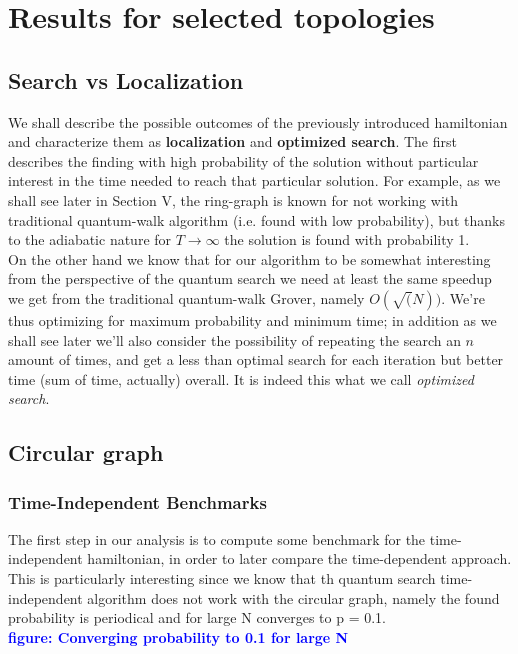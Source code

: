 \documentclass[aps,pra,reprint, onecolumn, showkeys]{revtex4-2}
\newcommand{\blue}[1]{\textcolor{blue}{\textbf{figure: #1}}}
\begin{document}
\clearpage
\section{Results for selected topologies}

\subsection{Search vs Localization}
We shall describe the possible outcomes of the previously introduced hamiltonian and characterize them as \textbf{localization} and \textbf{optimized search}. The first describes the finding with high probability of the solution without particular interest in the time needed to reach that particular solution. For example, as we shall see later in Section V, the ring-graph is known for not working with traditional quantum-walk algorithm (i.e. found with low probability), but thanks to the adiabatic nature for $T \to \infty$ the solution is found with probability 1. \\

On the other hand we know that for our algorithm to be somewhat interesting from the perspective of the quantum search we need at least the same speedup we get from the traditional quantum-walk Grover, namely $O(\sqrt(N))$. We're thus optimizing for maximum probability and minimum time; in addition as we shall see later we'll also consider the possibility of repeating the search an $n$ amount of times, and get a less than optimal search for each iteration but better time (sum of time, actually) overall. It is indeed this what we call \textit{optimized search}.


\subsection{Circular graph}
\subsubsection{Time-Independent Benchmarks}
The first step in our analysis is to compute some benchmark for the time-independent hamiltonian, in order to later compare the time-dependent approach. This is particularly interesting since we know that th quantum search time-independent algorithm does not work with the circular graph, namely the found probability is periodical and for large N converges to p = 0.1.\\ \blue{Converging probability to 0.1 for large N}\\
\end{document}
